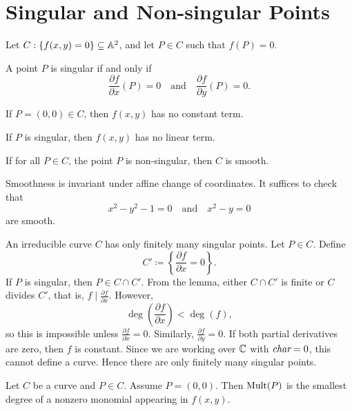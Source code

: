 
\section{Singular and Non-singular Points}

Let $C : \{f(x,y) = 0\}\subseteq \aa^2$, and let $P\in C$ such that $f(P) = 0$.

\begin{definition}
    A point $P$ is singular if and only if
    \[
        \frac{\partial f}{\partial x}(P) = 0
        \quad\text{and}\quad
        \frac{\partial f}{\partial y}(P) = 0.
    \]
\end{definition}

\begin{lemma*}{
    If $P = (0,0)\in C$, then $f(x,y)$ has no constant term.
}
\end{lemma*}

\begin{lemma*}{
    If $P$ is singular, then $f(x,y)$ has no linear term.
}
\end{lemma*}

\begin{definition}
    If for all $P\in C$, the point $P$ is non-singular, then $C$ is smooth.
\end{definition}

Smoothness is invariant under affine change of coordinates.
It suffices to check that
\[
    x^2 - y^2 - 1 = 0
    \quad\text{and}\quad
    x^2 - y = 0
\]
are smooth.

\begin{theorem}{
    An irreducible curve $C$ has only finitely many singular points.
}
Let $P\in C$.
Define
\[
    C' \coloneqq \left\{ \frac{\partial f}{\partial x} = 0 \right\}.
\]
If $P$ is singular, then $P\in C\cap C'$.
From the lemma, either $C\cap C'$ is finite or $C$ divides $C'$, that is, $f \mid \frac{\partial f}{\partial x}$.
However,
\[
    \deg\!\left(\frac{\partial f}{\partial x}\right) < \deg(f),
\]
so this is impossible unless $\frac{\partial f}{\partial x} = 0$.
Similarly, $\frac{\partial f}{\partial y} = 0$.
If both partial derivatives are zero, then $f$ is constant.
Since we are working over $\c$ with $\char = 0$, this cannot define a curve.
Hence there are only finitely many singular points.
\end{theorem}

\begin{definition}[Multiplicity]
    Let $C$ be a curve and $P\in C$.
    Assume $P=(0,0)$.
    Then $\Mult(P)$ is the smallest degree of a nonzero monomial appearing in $f(x,y)$.
\end{definition}

